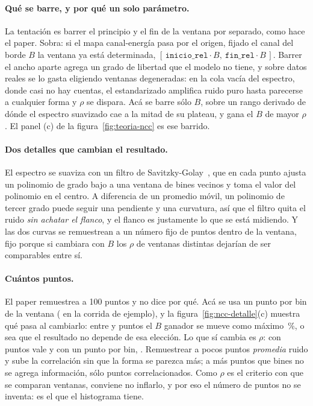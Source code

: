 \documentclass[11pt,a4paper]{article}
\begin{document}
\paragraph{Qué se barre, y por qué un solo parámetro.} La tentación es barrer
el principio y el fin de la ventana por separado, como hace el paper. Sobra:
si el mapa canal-energía pasa por el origen, fijado el canal del borde $B$ la
ventana ya está determinada,
$[\,\texttt{inicio\_rel}\cdot B,\ \texttt{fin\_rel}\cdot B\,]$. Barrer el ancho
aparte agrega un grado de libertad que el modelo no tiene, y sobre datos reales
se lo gasta eligiendo ventanas degeneradas: en la cola vacía del espectro, donde
casi no hay cuentas, el estandarizado amplifica ruido puro hasta parecerse a
cualquier forma y $\rho$ se dispara. Acá se barre sólo $B$, sobre un rango
derivado de dónde el espectro suavizado cae a la mitad de su plateau, y gana el
$B$ de mayor $\rho$. El panel (c) de la figura~\ref{fig:teoria-ncc} es ese
barrido.

\paragraph{Dos detalles que cambian el resultado.} El espectro se suaviza con
un filtro de Savitzky-Golay~\cite{savitzky1964}, que en cada punto ajusta un
polinomio de grado bajo a una ventana de bines vecinos y toma el valor del
polinomio en el centro. A diferencia de un promedio móvil, un polinomio de
tercer grado puede seguir una pendiente y una curvatura, así que el filtro
quita el ruido \emph{sin achatar el flanco}, y el flanco es justamente lo que
se está midiendo. Y las dos curvas se remuestrean a un número fijo de puntos
dentro de la ventana, fijo porque si cambiara con $B$ los $\rho$ de ventanas
distintas dejarían de ser comparables entre sí.

\paragraph{Cuántos puntos.} El paper remuestrea a 100 puntos y no dice por
qué. Acá se usa un punto por bin de la ventana (\EjNptsAuto{} en la corrida de
ejemplo), y la figura~\ref{fig:ncc-detalle}(c) muestra qué pasa al cambiarlo:
entre \NptsMin{} y \NptsMax{} puntos el $B$ ganador se mueve como máximo
\NptsBDesvMax\,\%, o sea que el resultado no depende de esa elección. Lo que
sí cambia es $\rho$: con \NptsMin{} puntos vale \NptsRhoPocos{} y con un punto
por bin, \NptsRhoAuto. Remuestrear a pocos puntos \emph{promedia} ruido y
sube la correlación sin que la forma se parezca más; a más puntos que bines
no se agrega información, sólo puntos correlacionados. Como $\rho$ es el
criterio con que se comparan ventanas, conviene no inflarlo, y por eso el
número de puntos no se inventa: es el que el histograma tiene.
\end{document}
